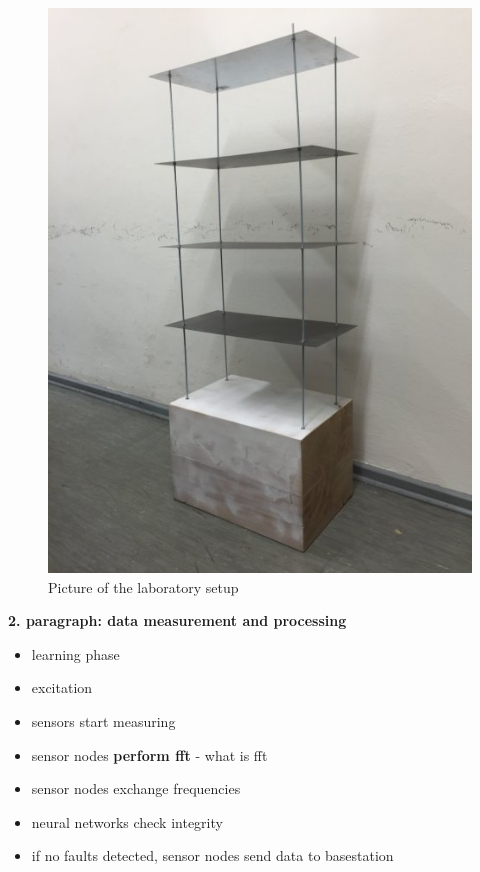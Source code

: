\documentclass[12pt,a4paper]{scrartcl}
\begin{document}
\begin{figure}[h!]
    \centering
    \includegraphics[scale=0.3]{figures/teststructure.jpg}
    \caption{Picture of the laboratory setup}
    \label{fig:teststructure}
\end{figure}


\textbf{2. paragraph: data measurement and processing}

\begin{itemize}
\item learning phase
\item excitation
\item sensors start measuring
\item sensor nodes \textbf{perform fft} - what is fft
\item sensor nodes exchange frequencies
\item neural networks check integrity
\item if no faults detected, sensor nodes send data to basestation
\end{itemize}
\end{document}
